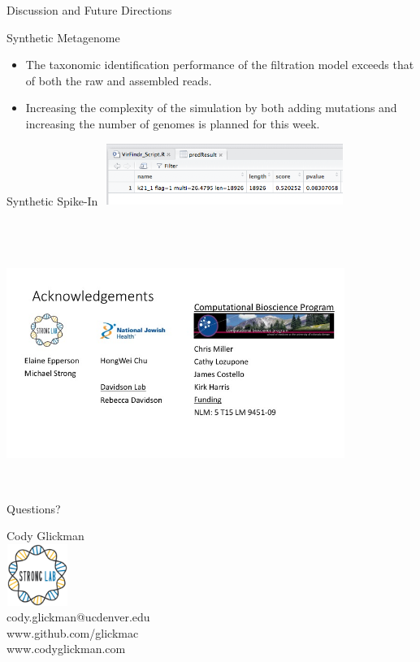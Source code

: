 \documentclass[11pt]{beamer}
\begin{document}
	\begin{frame}{Discussion and Future Directions}
	
	\begin{block}{Synthetic Metagenome}
	\begin{itemize}
	\item The taxonomic identification performance of the filtration model exceeds that of both the raw and assembled reads. 
	\item Increasing the complexity of the simulation by both adding mutations and increasing the number of genomes is planned for this week. 
	\end{itemize}
	\end{block}
	\begin{block}{Synthetic Spike-In}
	\includegraphics[height=2cm, width=8cm]{virfinder}
	\end{block}
	\end{frame}
	
\section{}
	
	\begin{frame}{}
	\vspace{1cm}
	{\includegraphics[height=8cm, width=11cm]{Acknowledge.jpg} }
	\end{frame}
	
	
	\begin{frame}{Questions?}
	
	Cody Glickman \\ \includegraphics[height=2cm, width=2cm]{lablogo.png} \\ cody.glickman@ucdenver.edu \\ \alert{www.github.com/glickmac} \\ www.codyglickman.com
	\end{frame}
	
\end{document}
